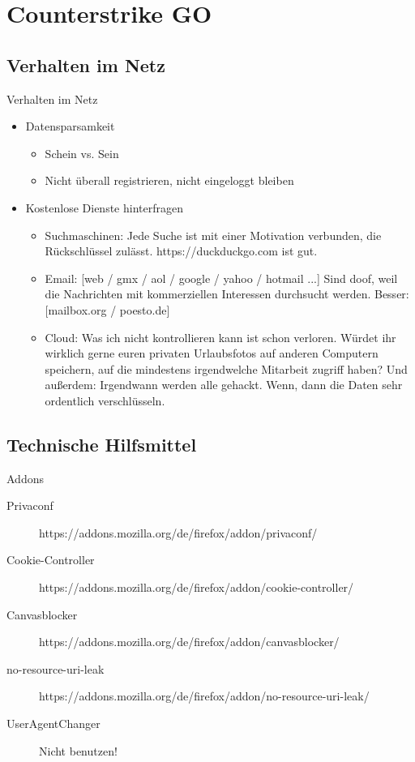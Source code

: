 \documentclass[utf8]{beamer}
\begin{document}
	\section{Counterstrike GO}
	\subsection{Verhalten im Netz}
	\begin{frame}{Verhalten im Netz}
		\begin{itemize}
			\item Datensparsamkeit
			\begin{itemize}
				\item Schein vs. Sein
				\item Nicht überall registrieren, nicht eingeloggt bleiben
			\end{itemize}
			\item Kostenlose Dienste hinterfragen
			\begin{itemize}
				\item Suchmaschinen:
				Jede Suche ist mit einer Motivation verbunden, die Rückschlüssel zulässt. https://duckduckgo.com ist gut.
				\item Email:
				[web / gmx / aol / google / yahoo / hotmail ...] Sind doof, weil die Nachrichten mit kommerziellen Interessen durchsucht werden. Besser: [mailbox.org / poesto.de]
				\item Cloud:
				Was ich nicht kontrollieren kann ist schon verloren. Würdet ihr wirklich gerne euren privaten Urlaubsfotos auf anderen Computern speichern, auf die mindestens irgendwelche Mitarbeit zugriff haben? Und außerdem: Irgendwann werden alle gehackt. Wenn, dann die Daten sehr ordentlich verschlüsseln.
			\end{itemize}
		\end{itemize}
	\end{frame}
	
	\subsection{Technische Hilfsmittel}
	\begin{frame}{Addons}
		\noindent
		\begin{description}
			\item[Privaconf]{https://addons.mozilla.org/de/firefox/addon/privaconf/}
			\item[Cookie-Controller]{https://addons.mozilla.org/de/firefox/addon/cookie-controller/}
			\item[Canvasblocker]{https://addons.mozilla.org/de/firefox/addon/canvasblocker/}
			\item[no-resource-uri-leak]{https://addons.mozilla.org/de/firefox/addon/no-resource-uri-leak/}
			\item[UserAgentChanger]{Nicht benutzen!}
		\end{description}
	\end{frame}
	
\end{document}
